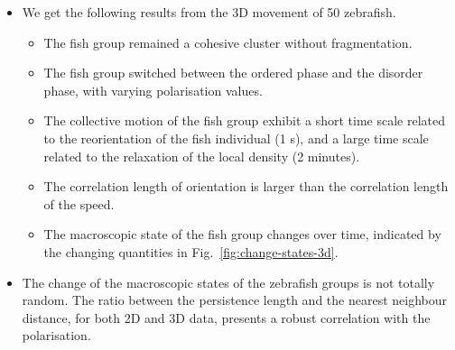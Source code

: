 \documentclass[11pt,twoside]{report}
\begin{document}
\begin{adjustwidth}{-5cm}{0cm}
\begin{tcolorbox}[
fonttitle=\sffamily\Large,
right=0.05\linewidth,
title=Summary of Chapter~5
]
\begin{itemize}
\begin{itemize}
		\item The correlation length of orientation is longer than the correlation length of the speed.
		\item The macroscopic state of the fish group changes over time, indicated by the changing quantities in Fig.~\ref{fig:change-states-2d}.
	\end{itemize}
	\item  We get the following results from the 3D movement of 50 zebrafish.
	\begin{itemize}
		\item The fish group remained a cohesive cluster without fragmentation.
		\item The fish group switched between the ordered phase and the disorder phase, with varying polarisation values.
		\item The collective motion of the fish group exhibit a short time scale related to the reorientation of the fish individual (1 s), and a large time scale related to the relaxation of the local density (2 minutes).
		\item The correlation length of orientation is larger than the correlation length of the speed.
		\item The macroscopic state of the fish group changes over time, indicated by the changing quantities in Fig.~\ref{fig:change-states-3d}.
	\end{itemize}
	\item The change of the macroscopic states of the zebrafish groups is not totally random. The ratio between the persistence length and the nearest neighbour distance, for both 2D and 3D data, presents a robust correlation with the polarisation.
\end{itemize}
\end{tcolorbox}
\end{adjustwidth}
\end{document}
